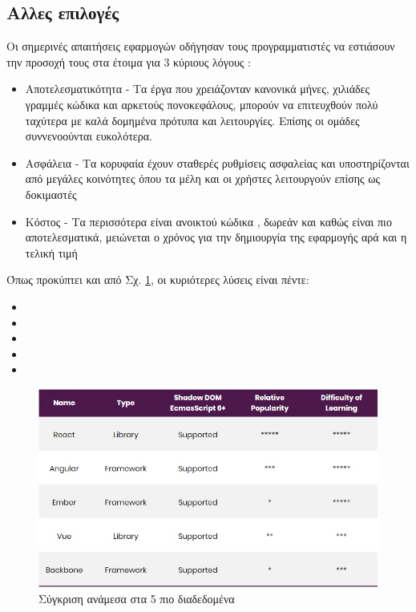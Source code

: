 \subsection*{Αλλες επιλογές}
Οι σημερινές απαιτήσεις εφαρμογών οδήγησαν τους προγραμματιστές να εστιάσουν την προσοχή τους στα έτοιμα  για 3 κύριους λόγους : 
\begin{itemize}
    \item Αποτελεσματικότητα - Τα έργα που χρειάζονταν κανονικά μήνες, χιλιάδες γραμμές κώδικα και αρκετούς πονοκεφάλους, μπορούν να επιτευχθούν πολύ ταχύτερα με καλά δομημένα πρότυπα και λειτουργίες. Επίσης οι ομάδες συννενοούνται ευκολότερα.
    \item Ασφάλεια - Τα κορυφαία  έχουν σταθερές ρυθμίσεις ασφαλείας και υποστηρίζονται από μεγάλες κοινότητες όπου τα μέλη και οι χρήστες λειτουργούν επίσης ως δοκιμαστές
    \item Κόστος - Τα περισσότερα είναι ανοικτού κώδικα , δωρεάν και καθώς είναι πιο αποτελεσματικά, μειώνεται ο χρόνος για την δημιουργία της εφαρμογής αρά και η τελική τιμή
\end{itemize}
Όπως προκύπτει και από Σχ. \ref{fig:jsComparison}, οι κυριότερες λύσεις είναι πέντε:
\begin{itemize}
    \item {}
    \item {}
    \item {}
    \item {}
    \item {}
\end{itemize}
\begin{figure}[ht]
\centering
\includegraphics[scale=0.5]{images/comparisonJSFW.jpg}
\caption{Σύγκριση ανάμεσα στα 5 πιο διαδεδομένα }
\label{fig:jsComparison}
\end{figure}
